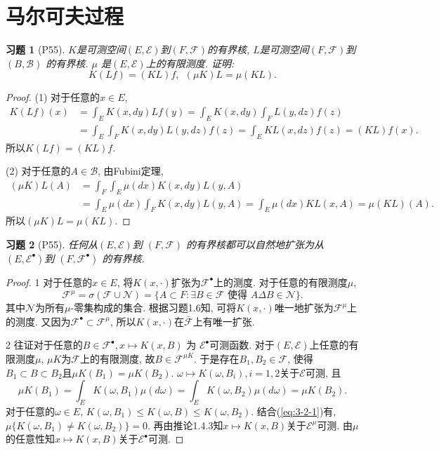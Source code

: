 \documentclass[UTF8,ondside]{ctexart}
\newtheorem{exercise}{习题}[section]
\newcommand{\h}{\mathscr}
\newcommand{\circlenumber}[1]{{\small\textcircled{\tiny{#1}}}}
\numberwithin{equation}{section}
\begin{document}
	\section{马尔可夫过程}
	\begin{exercise}[P55]
		$K$是可测空间$(E,\h E)$到$(F,\h F)$的有界核, $L$是可测空间$(F,\h F)$到$(B,\h B)$ 的有界核. $\mu$ 是$(E,\h E)$上的有限测度. 证明: 
		\[
			K(Lf)=(KL)f,\ \ (\mu K)L=\mu(KL).
		\]
	\end{exercise}
	\begin{proof}
		(1) 对于任意的$x\in E$, 
		\[\begin{aligned}
			K(Lf)(x)&=\int_E K(x,dy)Lf(y)
			=\int_E K(x,dy)\int_F L(y,dz)f(z)\\
			&=\int_E\int_F K(x,dy)L(y,dz)f(z)
			=\int_E KL(x,dz)f(z)
			=(KL)f(x).
		\end{aligned}
		\]
		所以$K(Lf)=(KL)f$.

		(2) 对于任意的$A\in \h B$, 由Fubini定理, 
		\[\begin{aligned}
			(\mu K)L(A)&=\int_F\int_E\mu(dx)K(x,dy)L(y,A)\\
			&=\int_E\mu(dx)\int_F K(x,dy)L(y,A)=\int_E\mu(dx)KL(x,A)=\mu(KL)(A).
		\end{aligned}
		\]
		所以$(\mu K)L=\mu(KL)$.
	\end{proof}
	\begin{exercise}[P55]
		任何从$(E,\h E)$到 $(F,\h F)$ 的有界核都可以自然地扩张为从 $(E,\h E^\bullet)$到 $(F,\h F^\bullet)$ 的有界核.
	\end{exercise}
	\begin{proof}
		\circlenumber{1} 对于任意的$x\in E$, 将$K(x,\cdot)$扩张为$\h F^\bullet$上的测度. 对于任意的有限测度$\mu$, 
		\[
			\h F^{\mu}=\sigma(\h F\cup \h N)=\{A\subset F:\exists B\in \h F \text{ 使得 } A\Delta B\in \h N\}.
		\]
		其中$\h N$为所有$\mu$-零集构成的集合. 根据习题1.6知, 可将$K(x,\cdot)$唯一地扩张为$\h F^\mu$上的测度. 又因为$\h F^\bullet\subset \h F^\mu$, 所以$K(x,\cdot)$在$\bar{\h F}$上有唯一扩张.

		\circlenumber{2} 往证对于任意的$B\in\h F^\bullet,x\mapsto K(x,B)$ 为 $\h E^\bullet$可测函数. 对于$(E,\h E)$上任意的有限测度$\mu$, $\mu K$为$\h F$上的有限测度, 故$B\in \h F^{\mu K}$. 于是存在$B_1,B_2\in \h F$, 使得$B_1\subset B\subset B_2$且$\mu K(B_1)=\mu K(B_2)$. $\omega\mapsto K(\omega,B_i),i=1,2$关于$\h E$可测, 且
		\begin{equation}\label{eq:3-2-1}
			\mu K(B_1)=\int_E K(\omega,B_1)\mu(d\omega)=\int_E K(\omega,B_2)\mu(d\omega)=\mu K(B_2).
		\end{equation}
		对于任意的$\omega\in E$, $K(\omega,B_1)\leq K(\omega,B)\leq K(\omega,B_2)$. 结合(\ref{eq:3-2-1})有, $\mu\{K(\omega,B_1)\neq K(\omega, B_2)\}=0$. 再由推论1.4.3知$x\mapsto K(x,B)$关于$\h E^\mu$可测. 由$\mu$的任意性知$x\mapsto K(x,B)$关于$\h E^\bullet$可测.
	\end{proof}
\end{document}
